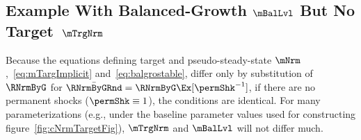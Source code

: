 \documentclass[BufferStockTheory]{subfiles}
\begin{document}

\subsection{Example With Balanced-Growth \texorpdfstring{$\mBalLvl$}{m} But No Target~\texorpdfstring{$\mTrgNrm$}{m}}

Because the equations defining target and pseudo-steady-state $\mNrm$,~\eqref{eq:mTargImplicit} and~\eqref{eq:balgrostable}, differ only by substitution of $\RNrmByG$ for $\bar{\RNrmByGRnd}=\RNrmByG \Ex[\permShk^{-1}]$, if there are no permanent shocks ($\permShk \equiv 1$), the conditions are identical.
For many parameterizations (e.g., under the baseline parameter values used for constructing figure~\ref{fig:cNrmTargetFig}), $\mTrgNrm$ and $\mBalLvl$ will not differ much.
\end{document}
